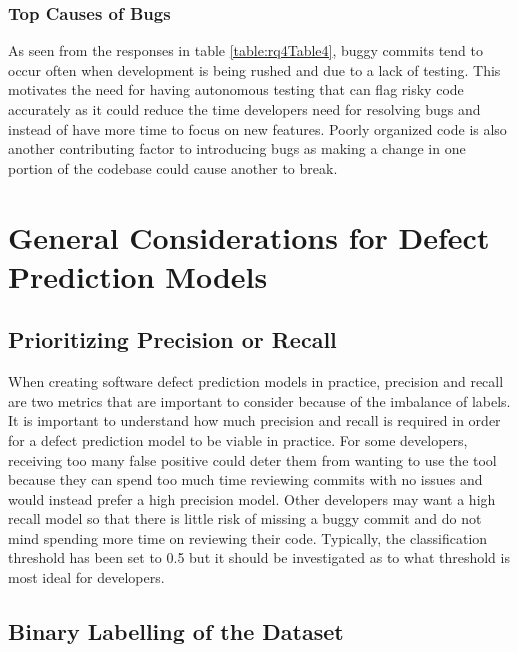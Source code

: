 \documentclass[../main.tex]{subfiles}
\begin{document}
\subsubsection{Top Causes of Bugs}

As seen from the responses in table \ref{table:rq4Table4}, buggy commits tend to occur often when development is being rushed and due to a lack of testing. This motivates the need for having autonomous testing that can flag risky code accurately as it could reduce the time developers need for resolving bugs and instead of have more time to focus on new features. Poorly organized code is also another contributing factor to introducing bugs as making a change in one portion of the codebase could cause another to break. 

\section{General Considerations for Defect Prediction Models}

\subsection{Prioritizing Precision or Recall}

When creating software defect prediction models in practice, precision and recall are two metrics that are important to consider because of the imbalance of labels. It is important to understand how much precision and recall is required in order for a defect prediction model to be viable in practice. For some developers, receiving too many false positive could deter them from wanting to use the tool because they can spend too much time reviewing commits with no issues and would instead prefer a high precision model. Other developers may want a high recall model so that there is little risk of missing a buggy commit and do not mind spending more time on reviewing their code. Typically, the classification threshold has been set to 0.5 but it should be investigated as to what threshold is most ideal for developers. 

\subsection{Binary Labelling of the Dataset}
\end{document}
